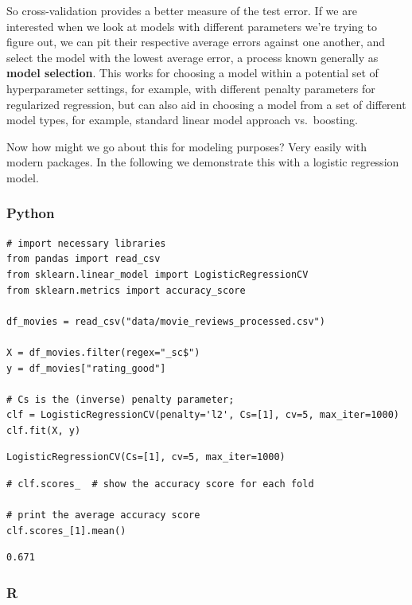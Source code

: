 \documentclass[
  letterpaper,
]{krantz}
\begin{document}
So cross-validation provides a better measure of the test error. If we
are interested when we look at models with different parameters we're
trying to figure out, we can pit their respective average errors against
one another, and select the model with the lowest average error, a
process known generally as \textbf{model selection}. This works for
choosing a model within a potential set of hyperparameter settings, for
example, with different penalty parameters for regularized regression,
but can also aid in choosing a model from a set of different model
types, for example, standard linear model approach vs.~boosting.

Now how might we go about this for modeling purposes? Very easily with
modern packages. In the following we demonstrate this with a logistic
regression model.

\subsubsection{Python}

\begin{verbatim}
# import necessary libraries
from pandas import read_csv
from sklearn.linear_model import LogisticRegressionCV
from sklearn.metrics import accuracy_score

df_movies = read_csv("data/movie_reviews_processed.csv")

X = df_movies.filter(regex="_sc$")
y = df_movies["rating_good"]

# Cs is the (inverse) penalty parameter;
clf = LogisticRegressionCV(penalty='l2', Cs=[1], cv=5, max_iter=1000)
clf.fit(X, y)
\end{verbatim}

\begin{verbatim}
LogisticRegressionCV(Cs=[1], cv=5, max_iter=1000)
\end{verbatim}

\begin{verbatim}
# clf.scores_  # show the accuracy score for each fold

# print the average accuracy score
clf.scores_[1].mean()
\end{verbatim}

\begin{verbatim}
0.671
\end{verbatim}

\subsubsection{R}
\end{document}
